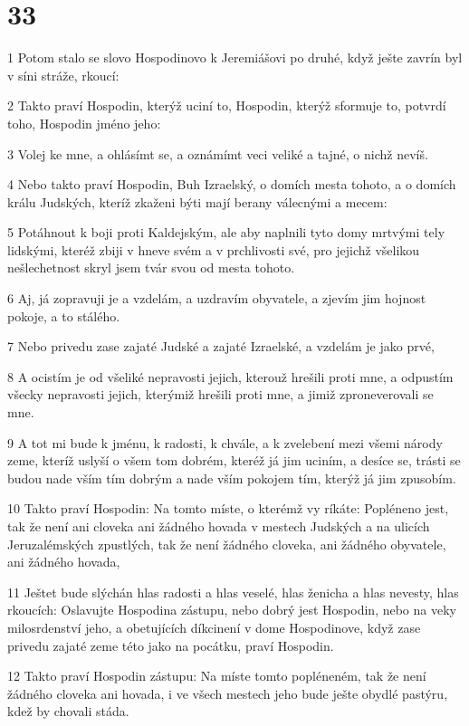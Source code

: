 \chapter{33}

\par 1 Potom stalo se slovo Hospodinovo k Jeremiášovi po druhé, když ješte zavrín byl v síni stráže, rkoucí:
\par 2 Takto praví Hospodin, kterýž uciní to, Hospodin, kterýž sformuje to, potvrdí toho, Hospodin jméno jeho:
\par 3 Volej ke mne, a ohlásímt se, a oznámímt veci veliké a tajné, o nichž nevíš.
\par 4 Nebo takto praví Hospodin, Buh Izraelský, o domích mesta tohoto, a o domích králu Judských, kteríž zkaženi býti mají berany válecnými a mecem:
\par 5 Potáhnout k boji proti Kaldejským, ale aby naplnili tyto domy mrtvými tely lidskými, kteréž zbiji v hneve svém a v prchlivosti své, pro jejichž všelikou nešlechetnost skryl jsem tvár svou od mesta tohoto.
\par 6 Aj, já zopravuji je a vzdelám, a uzdravím obyvatele, a zjevím jim hojnost pokoje, a to stálého.
\par 7 Nebo privedu zase zajaté Judské a zajaté Izraelské, a vzdelám je jako prvé,
\par 8 A ocistím je od všeliké nepravosti jejich, kterouž hrešili proti mne, a odpustím všecky nepravosti jejich, kterýmiž hrešili proti mne, a jimiž zproneverovali se mne.
\par 9 A tot mi bude k jménu, k radosti, k chvále, a k zvelebení mezi všemi národy zeme, kteríž uslyší o všem tom dobrém, kteréž já jim uciním, a desíce se, trásti se budou nade vším tím dobrým a nade vším pokojem tím, kterýž já jim zpusobím.
\par 10 Takto praví Hospodin: Na tomto míste, o kterémž vy ríkáte: Popléneno jest, tak že není ani cloveka ani žádného hovada v mestech Judských a na ulicích Jeruzalémských zpustlých, tak že není žádného cloveka, ani žádného obyvatele, ani žádného hovada,
\par 11 Ještet bude slýchán hlas radosti a hlas veselé, hlas ženicha a hlas nevesty, hlas rkoucích: Oslavujte Hospodina zástupu, nebo dobrý jest Hospodin, nebo na veky milosrdenství jeho, a obetujících díkcinení v dome Hospodinove, když zase privedu zajaté zeme této jako na pocátku, praví Hospodin.
\par 12 Takto praví Hospodin zástupu: Na míste tomto popléneném, tak že není žádného cloveka ani hovada, i ve všech mestech jeho bude ješte obydlé pastýru, kdež by chovali stáda.
